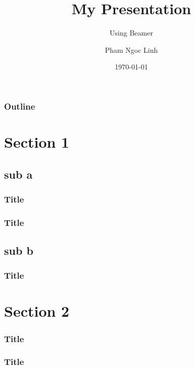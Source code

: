 \documentclass{beamer}
\title{My Presentation}
\subtitle{Using Beamer}
\author{Pham Ngoc Linh}
\date{\today}
\begin{document}
\begin{frame}
\titlepage
\end{frame}

\begin{frame}
\frametitle{Outline}
\tableofcontents
\end{frame}

\section{Section 1}
\subsection{sub a}
\begin{frame}
\frametitle{Title}

\end{frame}

\begin{frame}
\frametitle{Title}

\end{frame}

\subsection{sub b}
\begin{frame}
\frametitle{Title}

\end{frame}

\section{Section 2}

\begin{frame}
\frametitle{Title}

\end{frame}

\begin{frame}
\frametitle{Title}

\end{frame}
\end{document}
